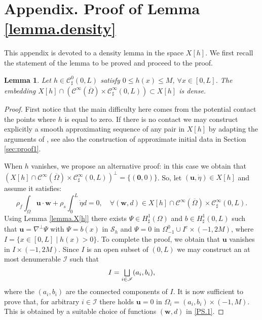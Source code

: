 \documentclass[JEP,XML,SOM,Unicode,NoFloatCountersInSection]{cedram}
\let\mathcal\mathscr
\let\oldbigsqcup\bigsqcup
\renewcommand{\bigsqcup}{\mathop{\textstyle\oldbigsqcup}\displaylimits}
\newtheorem{lemma}[theorem]{Lemma}
\theoremstyle{remark}
\theoremstyle{definition}
\newcommand{\ug}{\boldsymbol{u}}
\newcommand{\wg}{\boldsymbol{w}}
\newcommand{\BS}[1]{\boldsymbol{#1}}
\let\CM\Omega
\newcommand{\etap}{\dot{\eta}}
\begin{document}
\appendix
\section*{Appendix. Proof of Lemma \ref{lemma.density}}
\label{Annexe}
This appendix is devoted to a density lemma in the space $X[h]$.
We first recall the statement of the lemma to be proved and proceed
to the proof.

\begin{lemma}\label{lemma.density.app}
Let $h \in \mathcal C^0_{\sharp}(0,L)$ satisfy $0 \leq h(x) \leq M$, $\forall x\in [0, L]$. The embedding $X[h]\cap (\mathcal{C}^{\infty}(\overline{\CM}) \times \mathcal C^{\infty}_{\sharp}(0,L)) \subset X[h]$ is dense.
\end{lemma}

\begin{proof}
First notice that the main difficulty here comes from the potential contact \ie the points where $h$ is equal to zero. If there is no contact we may construct explicitly a smooth approximating sequence of any pair in $X[h]$ by adapting the arguments of \cite{Chambolle-etal}, see also the construction of approximate initial data in Section \ref{sec:proof1}.

When $h$ vanishes, we propose an alternative proof: in this case we obtain that $(X[h]\cap \mathcal{C}^{\infty}(\overline{\CM}) \times \mathcal C^{\infty}_{\sharp}(0,L))^{\perp}=\{(\BS{0},0)\}$. So, let $(\ug,\etap) \in X[h]$ and assume it satisfies:%
\begin{equation}\label{PS.1}\rho_{f}\int_{\CM}\ug\cdot\wg +\rho_{s}\int_{0}^{L}\etap d=0, \quad
\forall (\wg,d)\in X[h]\cap \mathcal{C}^{\infty}(\overline{\CM}) \times \mathcal C^{\infty}_{\sharp}(0,L).
\end{equation}
Using Lemma \ref{lemma.X[h]} there exists $\Psi\in H^{1}_{\sharp}(\CM)$ and $b\in H^{1}_{\sharp}(0,L)$ such that $\ug=\nabla^{\bot}\Psi$ with $\Psi=b(x)$ in $\mathcal{S}_{h}$ and $\Psi=0$ in $\Omega^{0}_{-1} \cup I^{c}\times(-1,2M)$, where $I=\{x\in[0,L]\mid h(x)>0\}$. To complete the proof, we obtain that $\ug$ vanishes in $I\times(-1,2M)$.
Since $I$ is an open subset of $(0,L)$ we may construct an at most denumerable $\mathcal I$ such that
\[
I=\bigsqcup_{i\in\mathcal I}(a_{i},b_{i}),
\]
where the $(a_{i},b_{i})$ are the connected components of $I$. It is now sufficient to prove that, for arbitrary $i\in \mathcal I$ there holds $\ug=0$ in $\CM_{i}=(a_{i},b_{i})\times(-1,M)$. This is obtained by a suitable choice of functions $(\wg,d)$ in \eqref{PS.1}.


\end{proof}
\end{document}
